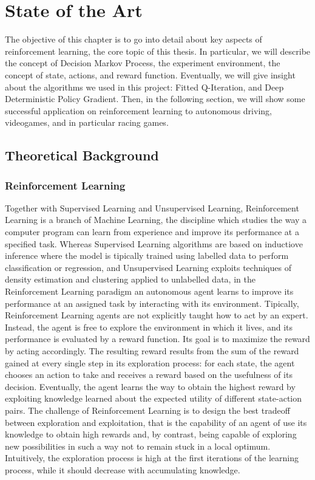 \chapter{State of the Art}
\label{State of the Art}
\thispagestyle{empty}



The objective of this chapter is to go into detail about key aspects of reinforcement learning, the core topic of this thesis. In particular, we will describe the concept of Decision Markov Process, the experiment environment, the concept of state, actions, and reward function. Eventually, we will give insight about the algorithms we used in this project: Fitted Q-Iteration, and Deep Deterministic Policy Gradient. 
Then, in the following section, we will show some successful application on reinforcement learning to autonomous driving, videogames, and in particular racing games.


\section{Theoretical Background}

\subsection{Reinforcement Learning}
Together with Supervised Learning and Unsupervised Learning, Reinforcement Learning is a branch of Machine Learning, the discipline which studies the way a computer program can learn from experience and improve its performance at a specified task. Whereas Supervised Learning algorithms are based on inductiove inference where the model is tipically trained using labelled data to perform classification or regression, and Unsupervised Learning exploits techniques of density estimation and clustering applied to unlabelled data, in the Reinforcement Learning paradigm an autonomous agent learns to improve its performance at an assigned task by interacting with its environment.
Tipically, Reinforcement Learning agents are not explicitly taught how to act by an expert. Instead, the agent is free to explore the environment in which it lives, and its performance is evaluated by a reward function. Its goal is to maximize the reward by acting accordingly. The resulting reward results from the sum of the reward gained at every single step in its exploration process: for each state, the agent chooses an action to take and receives a reward based on the usefulness of its decision. Eventually, the agent learns the way to obtain the highest reward by exploiting knowledge learned about the expected utility of different state-action pairs. The challenge of Reinforcement Learning is to design the best tradeoff between exploration and exploitation, that is the capability of an agent of use its knowledge to obtain high rewards and, by contrast, being capable of exploring new possibilities in such a way not to remain stuck in a local optimum. Intuitively, the exploration process is high at the first iterations of the learning process, while it should decrease with accumulating knowledge.

